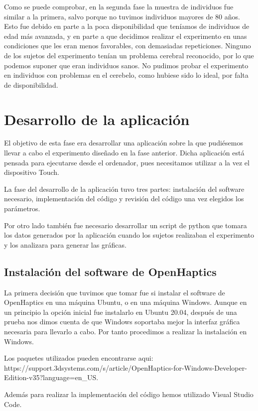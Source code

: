 \documentclass[a4paper,11pt, oneside]{book}
\begin{document}
Como se puede comprobar, en la segunda fase la muestra de individuos fue similar a la primera, salvo porque no tuvimos individuos mayores de 80 años. Esto fue debido en parte a la poca disponibilidad que teníamos de individuos de edad más avanzada, y en parte a que decidimos realizar el experimento en unas condiciones que les eran menos favorables, con demasiadas repeticiones. Ninguno de los sujetos del experimento tenían un problema cerebral reconocido, por lo que podemos suponer que eran individuos sanos. No pudimos probar el experimento en individuos con problemas en el cerebelo, como hubiese sido lo ideal, por falta de disponibilidad.

\section{Desarrollo de la aplicación}

El objetivo de esta fase era desarrollar una aplicación sobre la que pudiésemos llevar a cabo el experimento diseñado en la fase anterior. Dicha aplicación está pensada para ejecutarse desde el ordenador, pues necesitamos utilizar a la vez el dispositivo Touch.

La fase del desarrollo de la aplicación tuvo tres partes: instalación del software necesario, implementación del código y revisión del código una vez elegidos los parámetros.

Por otro lado también fue necesario desarrollar un script de python que tomara los datos generados por la aplicación cuando los sujetos realizaban el experimento y los analizara para generar las gráficas.

\subsection{Instalación del software de OpenHaptics}

La primera decisión que tuvimos que tomar fue si instalar el software de OpenHaptics en una máquina Ubuntu, o en una máquina Windows. Aunque en un principio la opción inicial fue instalarlo en Ubuntu 20.04, después de una prueba nos dimos cuenta de que Windows soportaba mejor la interfaz gráfica necesaria para llevarlo a cabo. Por tanto procedimos a realizar la instalación en Windows.

Los paquetes utilizados pueden encontrarse aqui: https://support.3dsystems.com/s/article/OpenHaptics-for-Windows-Developer-Edition-v35?language=en\_US.

Además para realizar la implementación del código hemos utilizado Visual Studio Code.
\end{document}
